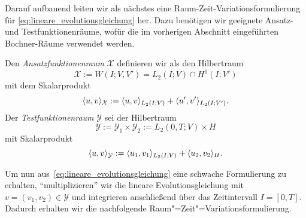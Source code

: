 \documentclass[../main.tex]{subfiles}
\begin{document}
Darauf aufbauend leiten wir als nächstes eine Raum-Zeit-Variationsformulierung für \cref{eq:lineare_evolutionsgleichung} her.
Dazu benötigen wir geeignete Ansatz- und Testfunktionenräume, wofür die im vorherigen Abschnitt eingeführten Bochner-Räume verwendet werden.

\begin{Definition}
\label{definition:ansatz_und_testraum}
    Den \emph{Ansatzfunktionenraum} $\mathcal X$ definieren wir als den Hilbertraum
    \begin{equation}
    \label{eq:ansatzraum_X}
        \mathcal X := W(I; V, V') = L_{2}(I; V) \cap H^{1}(I; V')
    \end{equation}
    mit dem Skalarprodukt
    \begin{equation}
    \label{eq:ansatzraum_skalarprodukt}
        \langle u,v\rangle_{\mathcal X} := \langle u,v\rangle_{L_{2}(I; V)} + \langle u',v'\rangle_{L_{2}(I; V')}.
    \end{equation}
    Der \emph{Testfunktionenraum} $\mathcal Y$ sei der Hilbertraum
    \begin{equation}
    \label{eq:testraum_Y}
        \mathcal Y := \mathcal Y_{1} \times \mathcal Y_{2} := L_{2}(0, T; V) \times H
    \end{equation}
    mit Skalarprodukt
    \begin{equation}
        \label{eq:testraum_skalarprodukt}
        \langle u,v\rangle_{\mathcal Y} := \langle u_{1},v_{1}\rangle_{L_{2}(I; V)} + \langle u_{2},v_{2}\rangle_{H}.
    \end{equation}
\end{Definition}

Um nun aus~\cref{eq:lineare_evolutionsgleichung} eine schwache Formulierung zu erhalten, \enquote{multiplizieren} wir die lineare Evolutionsgleichung mit $v = (v_{1}, v_{2}) \in \mathcal Y$ und integrieren anschließend über das Zeitintervall $I = [0, T]$.
Dadurch erhalten wir die nachfolgende Raum"=Zeit"=Variationsformulierung.
\end{document}
